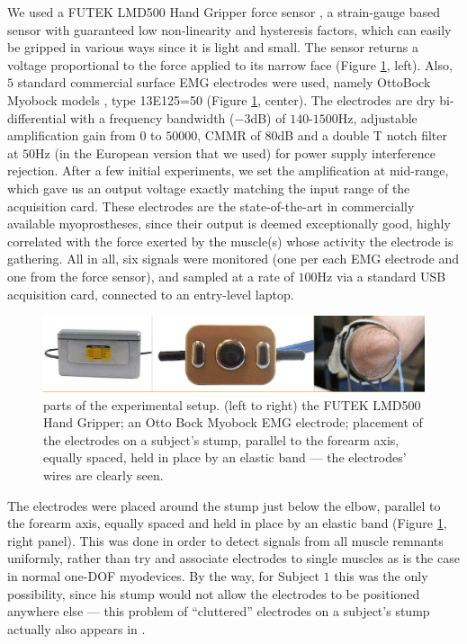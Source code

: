 We used a FUTEK LMD500 Hand Gripper force sensor \cite{futek}, a strain-gauge
based sensor with guaranteed low non-linearity and hysteresis factors, which can easily
be gripped in various ways since it is light and small. The sensor returns a
voltage proportional to the force applied to its narrow face (Figure \ref{fig:setup}, left).
Also, $5$ standard commercial surface EMG electrodes were used, namely OttoBock
Myobock models \cite{myobock}, type 13E125=50 (Figure \ref{fig:setup}, center).
The electrodes are dry bi-differential with a frequency bandwidth ($-3$dB) of
$140$-$1500$Hz, adjustable amplification gain from $0$ to $50000$, CMMR of
$80$dB and a double T notch filter at $50$Hz (in the European version
that we used) for power supply interference rejection. After a few initial
experiments, we set the amplification at mid-range, which gave us an output voltage
exactly matching the input range of the acquisition card.
These electrodes are the state-of-the-art in commercially available myoprostheses,
since their output is deemed exceptionally good, highly correlated with the
force exerted by the muscle(s) whose activity the electrode is gathering.
All in all, six signals were monitored (one per each EMG electrode and one from the
force sensor), and sampled at a rate of $100$Hz via a standard USB acquisition card,
connected to an entry-level laptop.

\begin{figure}[!ht] \centering
  \includegraphics[width=\textwidth]{figs/setup}
  \caption{parts of the experimental setup. (left to right) the FUTEK LMD500
    Hand Gripper; an Otto Bock Myobock EMG electrode; placement of the electrodes
    on a subject's stump, parallel to the forearm axis, equally spaced, held in
    place by an elastic band --- the electrodes' wires are clearly seen.}
  \label{fig:setup}
\end{figure}

The electrodes were placed around the stump just below the elbow, parallel
to the forearm axis, equally spaced and held in place by an elastic band
(Figure \ref{fig:setup}, right panel). This was done
in order to detect signals from all muscle remnants uniformly,
rather than try and associate electrodes to single muscles
as is the case in normal one-DOF myodevices. By the way, for Subject $1$
this was the only possibility, since his stump
would not allow the electrodes to be positioned anywhere else --- this problem
of ``cluttered'' electrodes on a subject's stump actually also appears in
\cite{sebelius}.

